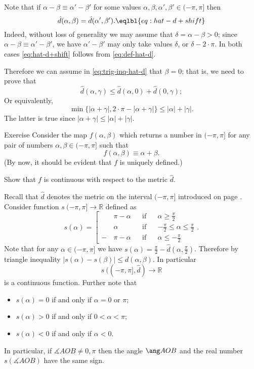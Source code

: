 {Note that if $\alpha-\beta\equiv \alpha'-\beta'$
for some values 
$\alpha,\beta,\alpha',\beta'\in (-\pi,\pi]$
then 
$$\hat{d}(\alpha,\beta)
=
\hat{d}(\alpha',\beta').
\eqlbl{eq:hat-d+shift}$$
Indeed, without loss of generality we may assume that $\delta=\alpha-\beta>0$;
since $\alpha-\beta\equiv \alpha'-\beta'$,
we have $\alpha'-\beta'$ may only take  values $\delta$, or $\delta-2\cdot\pi $.
In both cases \ref{eq:hat-d+shift} follows from \ref{eq:def-hat-d}.

Therefore we can assume in \ref{eq:trig-inq-hat-d}
that $\beta=0$;
that is, we need to prove that
$$\hat{d}(\alpha,\gamma)
\le 
\hat{d}(\alpha,0)+\hat{d}(0,\gamma);
$$
Or equivalently,
$$\min\{|\alpha+\gamma|,2\cdot\pi-|\alpha+\gamma|\}\le |\alpha|+|\gamma|.$$
The latter is true since 
$|\alpha+\gamma|\le |\alpha|+|\gamma|$.
\qeds

\begin{thm}{Exercise}\label{ex:hat-d-and-+}
Consider the map 
$f(\alpha,\beta)$ which returns a number in $(-\pi,\pi]$ for any pair of numbers $\alpha,\beta\in (-\pi,\pi]$
such that 
$$f(\alpha,\beta)\equiv \alpha+\beta.$$
(By now, it should be evident that $f$ is uniquely defined.)

Show that $f$ is continuous with respect to the metric $\hat d$.
\end{thm}











Recall that $\hat d$ denotes the metric on the interval $(-\pi,\pi]$
introduced on page \pageref{def:max-dist}.
Consider function $s\:(-\pi,\pi]\to \mathbb{R}$
defined as 
$$s(\alpha)=\left[
\begin{aligned}
&\pi-\alpha&&\text{if}&&\alpha\ge\tfrac\pi2
\\
&\alpha&&\text{if}&&-\tfrac\pi2\le\alpha\le\tfrac\pi2
\\
-\,&\pi-\alpha&&\text{if}&&\alpha\le-\tfrac\pi2
\end{aligned}
\right.
.$$
Note that for any $\alpha\in (-\pi,\pi]$ we have
$s(\alpha)=\tfrac\pi2-\hat d(\alpha,\tfrac\pi2)$.
Therefore by triangle inequality
$|s(\alpha)-s(\beta)|\le d(\alpha,\beta)$. 
In particular 
$$s\:((-\pi,\pi],\hat{d})\to\mathbb{R}$$ 
is a continuous function.
Further note that
\begin{itemize}
\item $s(\alpha)=0$ if and only if $\alpha=0$ or $\pi$;
\item $s(\alpha)>0$ if and only if $0<\alpha<\pi$;
\item $s(\alpha)<0$ if and only if $\alpha<0$.
\end{itemize}
In particular, if $\measuredangle AOB\ne 0,\pi$ 
then the angle $\ang AOB$ and the real number $s(\measuredangle AOB)$ have the same sign.

}
